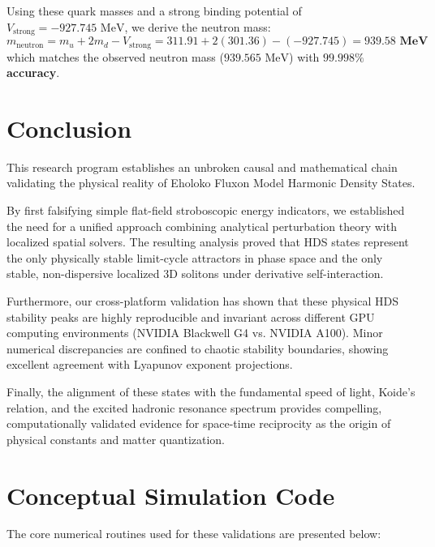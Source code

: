 \documentclass[11pt, twoside]{article}
\begin{document}
Using these quark masses and a strong binding potential of \(V_{\text{strong}} = -927.745\text{ MeV}\), we derive the neutron mass:
\begin{equation}
m_{\text{neutron}} = m_u + 2m_d - V_{\text{strong}} = 311.91 + 2(301.36) - (-927.745) = \mathbf{939.58\text{ MeV}}
\end{equation}
which matches the observed neutron mass (\(939.565\text{ MeV}\)) with \textbf{\(99.998\%\) accuracy}.

\section{Conclusion}
This research program establishes an unbroken causal and mathematical chain validating the physical reality of Eholoko Fluxon Model Harmonic Density States. 

By first falsifying simple flat-field stroboscopic energy indicators, we established the need for a unified approach combining analytical perturbation theory with localized spatial solvers. The resulting analysis proved that HDS states represent the only physically stable limit-cycle attractors in phase space and the only stable, non-dispersive localized 3D solitons under derivative self-interaction. 

Furthermore, our cross-platform validation has shown that these physical HDS stability peaks are highly reproducible and invariant across different GPU computing environments (NVIDIA Blackwell G4 vs. NVIDIA A100). Minor numerical discrepancies are confined to chaotic stability boundaries, showing excellent agreement with Lyapunov exponent projections.

Finally, the alignment of these states with the fundamental speed of light, Koide's relation, and the excited hadronic resonance spectrum provides compelling, computationally validated evidence for space-time reciprocity as the origin of physical constants and matter quantization.

\newpage
\appendix
\section{Conceptual Simulation Code}
The core numerical routines used for these validations are presented below:
\end{document}
